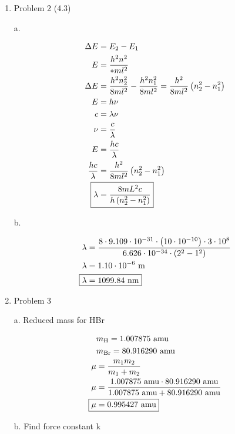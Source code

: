 \documentclass[12pt]{article}
\begin{document}
\begin{enumerate}
    \newpage
    \item Problem 2 (4.3)
    
    a. 

    \begin{align*}
        \Delta E &= E_2 - E_1 \\
        E &= \frac{h^2n^2}{*ml^2} \\
        \Delta E &= \frac{h^2n_2^2}{8ml^2} - \frac{h^2n_1^2}{8ml^2} = \frac{h^2}{8ml^2} \left(n_2^2 - n_1^2\right) \\
        E &= h\nu \\
        c &= \lambda \nu \\
        \nu &= \frac{c}{\lambda} \\
        E &= \frac{hc}{\lambda} \\
        \frac{hc}{\lambda} &= \frac{h^2}{8ml^2} \left(n_2^2 - n_1^2\right) \\
        \Aboxed{\lambda &= \frac{8mL^2c}{h\left(n_2^2 - n_1^2\right)}}
    \end{align*}

    b.

    \begin{align*}
        \lambda &= \frac{8 \cdot 9.109 \cdot 10^{-31} \cdot \left(10\cdot10^{-10}\right) \cdot 3 \cdot 10^8}{6.626 \cdot 10^{-34} \cdot \left(2^2 - 1^2\right)} \\
        \lambda &= 1.10\cdot10^{-6} \text{ m} \\
        \Aboxed{\lambda &= 1099.84\text{ nm} }
    \end{align*}

    \newpage
    \item Problem 3
    
    a. Reduced mass for HBr

    \begin{align*}
        & m_{\text{H}} = 1.007875 \text{ amu} \\
        & m_{\text{Br}} = 80.916290 \text{ amu} \\ 
        \mu &= \frac{m_1m_2}{m_1 + m_2} \\
        \mu &= \frac{1.007875 \text{ amu} \cdot 80.916290 \text{ amu}}{1.007875 \text{ amu} + 80.916290 \text{ amu}} \\
        \Aboxed{\mu &= 0.995427 \text{ amu}}
    \end{align*}

    b. Find force constant k


\end{enumerate}
\end{document}
